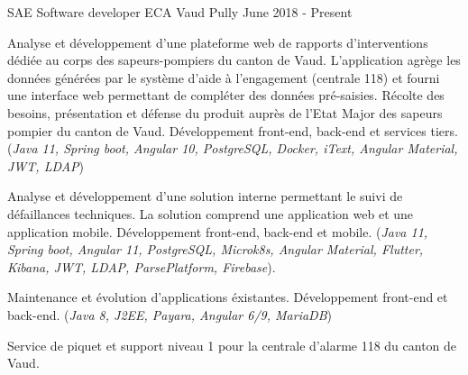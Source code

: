 


\begin{cventries}


\cventry
{SAE Software developer} %
{ECA Vaud} %
{Pully} %
{June 2018 - Present} %
{ %
\begin{cvitems}
\item {Analyse et développement d'une plateforme web de rapports d'interventions dédiée au corps des sapeurs-pompiers du canton de Vaud.
L'application agrège les données générées par le système d'aide à l'engagement (centrale 118) et fourni une interface web permettant de compléter des données pré-saisies.
Récolte des besoins, présentation et défense du produit auprès de l'Etat Major des sapeurs pompier du canton de Vaud. Développement front-end, back-end et services tiers.
(\emph{Java 11, Spring boot, Angular 10, PostgreSQL, Docker, iText, Angular Material, JWT, LDAP})}
\item {Analyse et développement d'une solution interne permettant le suivi de défaillances techniques. La solution comprend une application web et une application mobile. Développement front-end, back-end et mobile. (\emph{Java 11, Spring boot, Angular 11, PostgreSQL, Microk8s, Angular Material, Flutter, Kibana, JWT, LDAP, ParsePlatform, Firebase}).}
\item {Maintenance et évolution d'applications éxistantes. Développement front-end et back-end. (\emph{Java 8, J2EE, Payara, Angular 6/9, MariaDB})}
\item {Service de piquet et support niveau 1 pour la centrale d'alarme 118 du canton de Vaud.}
\end{cvitems}
}



\end{cventries}
